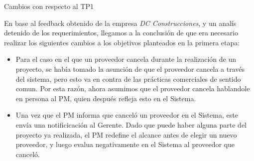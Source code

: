 Cambios con respecto al TP1

En base al feedback obtenido de la empresa \textit{DC Construcciones}, y un analís detenido de los requerimientos, llegamos a la conclusión de que era necesario realizar los siguientes cambios a los objetivos planteados en la primera etapa:

\begin{itemize}
  \item Para el caso en el que un proveedor cancela durante la realización de un proyecto, se había tomado la asunción de que el proveedor cancela a través del sistema, pero esto va en contra de las prácticas comerciales de sentido comun. Por esta razón, ahora asumimos que el proveedor cancela hablandole en persona al PM, quien después refleja esto en el Sistema.
  \item Una vez que el PM informa que canceló un proveedor en el Sistema, este envía una notificicación al Gerente. Dado que puede haber alguna parte del proyecto ya realizada, el PM redefine el alcance antes de elegir un nuevo proveedor, y luego evalua negativamente en el Sistema al proveedor que canceló.
\end{itemize}
